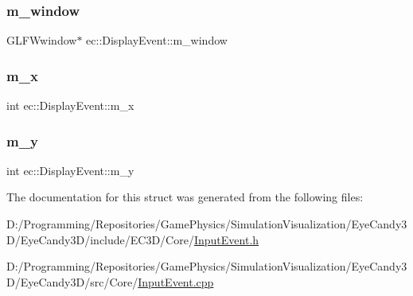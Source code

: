 \mbox{\label{structec_1_1_display_event_a501ab5209368544f1c264b3e25a87185}} 
\subsubsection{\texorpdfstring{m\+\_\+window}{m\_window}}
{\footnotesize\ttfamily G\+L\+F\+Wwindow$\ast$ ec\+::\+Display\+Event\+::m\+\_\+window}

\mbox{\label{structec_1_1_display_event_a35b371c7098cc98509f44e6fe2802945}} 
\subsubsection{\texorpdfstring{m\+\_\+x}{m\_x}}
{\footnotesize\ttfamily int ec\+::\+Display\+Event\+::m\+\_\+x}

\mbox{\label{structec_1_1_display_event_aa4314e0538f9929b39e37bb400ac2220}} 
\subsubsection{\texorpdfstring{m\+\_\+y}{m\_y}}
{\footnotesize\ttfamily int ec\+::\+Display\+Event\+::m\+\_\+y}



The documentation for this struct was generated from the following files\+:\begin{DoxyCompactItemize}
\item 
D\+:/\+Programming/\+Repositories/\+Game\+Physics/\+Simulation\+Visualization/\+Eye\+Candy3\+D/\+Eye\+Candy3\+D/include/\+E\+C3\+D/\+Core/\mbox{\hyperlink{_input_event_8h}{Input\+Event.\+h}}\item 
D\+:/\+Programming/\+Repositories/\+Game\+Physics/\+Simulation\+Visualization/\+Eye\+Candy3\+D/\+Eye\+Candy3\+D/src/\+Core/\mbox{\hyperlink{_input_event_8cpp}{Input\+Event.\+cpp}}\end{DoxyCompactItemize}
